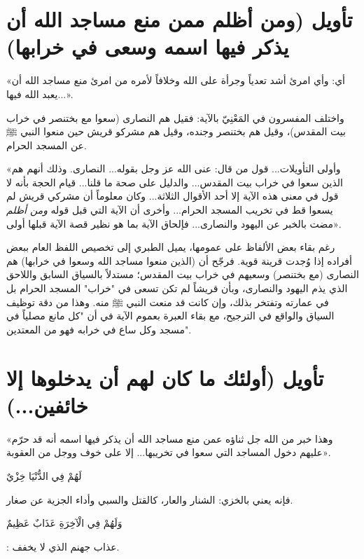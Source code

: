 \separator

\section{تأويل (ومن أظلم ممن منع مساجد الله أن يذكر فيها اسمه وسعى في خرابها)}
 «أي: وأي امرئ أشد تعدياً وجرأة على الله وخلافاً لأمره من امرئ منع مساجد الله أن يعبد الله فيها...».

واختلف المفسرون في المَعْنِيّ بالآية: فقيل هم النصارى (سعوا مع بختنصر في خراب بيت المقدس)، وقيل هم بختنصر وجنده، وقيل هم مشركو قريش حين منعوا النبي ﷺ عن المسجد الحرام.

 «وأولى التأويلات... قول من قال: عنى الله عز وجل بقوله... النصارى. وذلك أنهم هم الذين سعوا في خراب بيت المقدس... والدليل على صحة ما قلنا... قيام الحجة بأنه لا قول في معنى هذه الآية إلا أحد الأقوال الثلاثة... وكان معلوماً أن مشركي قريش لم يسعوا قط في تخريب المسجد الحرام... وأخرى أن الآية التي قبل قوله \textit{ومن أظلم} مضت بالخبر عن اليهود والنصارى... فإلحاق الآية بما هو نظير قصة الآية قبلها أولى».

\begin{fawaid}
رغم بقاء بعض الألفاظ على عمومها، يميل الطبري إلى تخصيص اللفظ العام ببعض أفراده إذا وُجدت قرينة قوية. فرجّح أن (الذين منعوا مساجد الله وسعوا في خرابها) هم النصارى (مع بختنصر) وسعيهم في خراب بيت المقدس؛ مستدلاً بالسياق السابق واللاحق الذي يذم اليهود والنصارى، وبأن قريشاً لم تكن تسعى في "خراب" المسجد الحرام بل في عمارته وتفتخر بذلك، وإن كانت قد منعت النبي ﷺ منه. وهذا من دقة توظيف السياق والواقع في الترجيح، مع بقاء العبرة بعموم الآية في أن "كل مانع مصلياً في مسجد وكل ساع في خرابه فهو من المعتدين".
\end{fawaid}

\separator

\section{تأويل (أولئك ما كان لهم أن يدخلوها إلا خائفين...)}
 «وهذا خبر من الله جل ثناؤه عمن منع مساجد الله أن يذكر فيها اسمه أنه قد حرّم عليهم دخول المساجد التي سعوا في تخريبها... إلا على خوف ووجل من العقوبة».

 \begin{ayah}لَهُمْ فِي الدُّنْيَا خِزْيٌ\end{ayah} فإنه يعني بالخزي: الشنار والعار، كالقتل والسبي وأداء الجزية عن صغار. \begin{ayah}وَلَهُمْ فِي الْآخِرَةِ عَذَابٌ عَظِيمٌ\end{ayah}: عذاب جهنم الذي لا يخفف.

